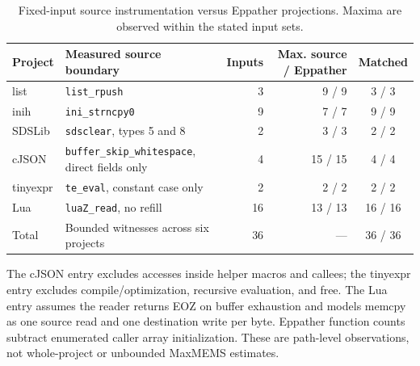 \begin{table}[t]
\centering
\caption{Fixed-input source instrumentation versus Eppather projections. Maxima are observed within the stated input sets.}
\label{tab:six-project-bounded-source}
\begin{tabular}{llrrc}
\hline
Project & Measured source boundary & Inputs & Max. source / Eppather & Matched \\ \hline
list & \texttt{list\_rpush} & 3 & 9 / 9 & 3 / 3 \\
inih & \texttt{ini\_strncpy0} & 9 & 7 / 7 & 9 / 9 \\
SDSLib & \texttt{sdsclear}, types 5 and 8 & 2 & 3 / 3 & 2 / 2 \\
cJSON & \texttt{buffer\_skip\_whitespace}, direct fields only & 4 & 15 / 15 & 4 / 4 \\
tinyexpr & \texttt{te\_eval}, constant case only & 2 & 2 / 2 & 2 / 2 \\
Lua & \texttt{luaZ\_read}, no refill & 16 & 13 / 13 & 16 / 16 \\ \hline
Total & Bounded witnesses across six projects & 36 & --- & 36 / 36 \\ \hline
\end{tabular}
\begin{minipage}{0.97\textwidth}\footnotesize
The cJSON entry excludes accesses inside helper macros and callees; the tinyexpr entry excludes compile/optimization, recursive evaluation, and free. The Lua entry assumes the reader returns EOZ on buffer exhaustion and models memcpy as one source read and one destination write per byte. Eppather function counts subtract enumerated caller array initialization. These are path-level observations, not whole-project or unbounded MaxMEMS estimates.
\end{minipage}
\end{table}
